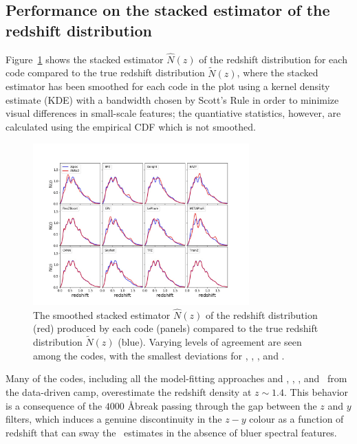 \subsection{Performance on the stacked estimator of the redshift distribution}
\label{sec:stackedmetrics_results}

Figure~\ref{fig:nz} shows the stacked estimator $\hat{N}(z)$ of the redshift distribution for each code compared to the true redshift distribution $\tilde{N}(z)$, where the stacked estimator has been smoothed for each code in the plot using a kernel density estimate (KDE) with a bandwidth chosen by Scott's Rule \citep{Scott:1992} in order to minimize visual differences in small-scale features; the quantiative statistics, however, are calculated using the empirical CDF which is not smoothed.

\begin{figure}
\centering
\includegraphics[width=0.74\textwidth]{fig/NZsumplot_12codes_scottsrule.jpg}
\caption{The smoothed stacked estimator $\hat{N}(z)$ of the redshift distribution (red) produced by each code (panels) compared to the true redshift distribution $\tilde{N}(z)$ (blue).
Varying levels of agreement are seen among the codes, with the smallest deviations for \cmnn, \flexzboost, \tpz, and \trainz.}
\label{fig:nz}
\end{figure}

Many of the codes, including all the model-fitting approaches and \annz, \gpz, \metaphor, and \skynet\ from the data-driven camp, overestimate the redshift density at $z \sim 1.4$.
This behavior is a consequence of the $4000$ \AA break passing through the gap between the $z$ and $y$ filters, which induces a genuine discontinuity in the $z - y$ colour as a function of redshift that can sway the \pzpdf\ estimates in the absence of bluer spectral features.

